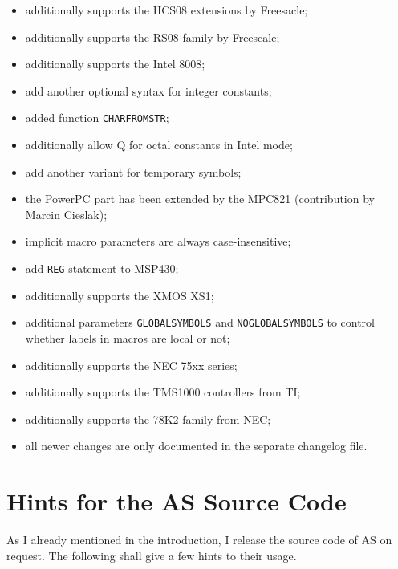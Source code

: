 \documentclass[12pt,twoside]{report}
\newcommand{\tty}[1]{{\tt #1}}
\begin{document}
\begin{itemize}
{\begin{itemize}
{            Semiconductor;}
      \item{additionally supports the HCS08 extensions by Freesacle;}
      \item{additionally supports the RS08 family by Freescale;}
      \item{additionally supports the Intel 8008;}
      \item{add another optional syntax for integer constants;}
      \item{added function \tty{CHARFROMSTR};}
      \item{additionally allow Q for octal constants in Intel mode;}
      \item{add another variant for temporary symbols;}
      \item{the PowerPC part has been extended by the MPC821
            (contribution by Marcin Cieslak);}
      \item{implicit macro parameters are always case-insensitive;}
      \item{add \tty{REG} statement to MSP430;}
      \item{additionally supports the XMOS XS1;}
      \item{additional parameters \tty{GLOBALSYMBOLS} and
            \tty{NOGLOBALSYMBOLS} to control whether labels in
            macros are local or not;}
      \item{additionally supports the NEC 75xx series;}
      \item{additionally supports the TMS1000 controllers from
            TI;}
      \item{additionally supports the 78K2 family from NEC;}
      \item{all newer changes are only documented in the separate
            changelog file.}
      \end{itemize}}
\end{itemize}


\cleardoublepage
\chapter{Hints for the AS Source Code}
\label{ChapSource}

As I already mentioned in the introduction, I release the source code of
AS on request.  The following shall give a few hints to their usage.

\end{document}
